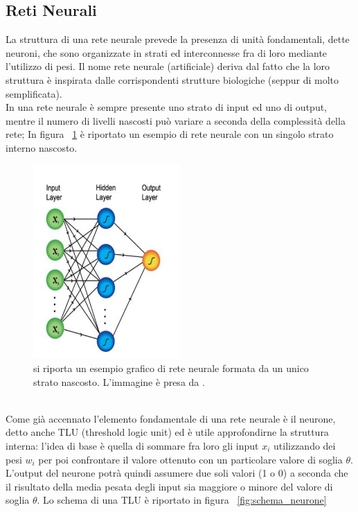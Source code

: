 \subsection{Reti Neurali}
\label{reti neurali}
La struttura di una rete neurale prevede la presenza di unità fondamentali, dette neuroni, che sono organizzate in strati ed interconnesse fra di loro mediante l'utilizzo di pesi. Il nome rete neurale (artificiale) deriva dal fatto che la loro struttura è inspirata dalle corrispondenti strutture biologiche (seppur di molto semplificata). \\
In una rete neurale è sempre presente uno strato di input ed uno di output, mentre il numero di livelli nascosti può variare a seconda della complessità della rete; In figura ~\ref{fig:schemaNN} è riportato un esempio di rete neurale con un singolo strato interno nascosto.
\begin{figure}[h!]
	\centering
	\includegraphics[width=0.50\textwidth]{figs/schemaNN.png}
	\caption{si riporta un esempio grafico di rete neurale formata da un unico strato nascosto. L'immagine è presa da \cite{Metodi_multivariati}.}
	\label{fig:schemaNN}
\end{figure}
\\
Come già accennato l'elemento fondamentale di una rete neurale è il neurone, detto anche TLU (threshold logic unit) ed è utile approfondirne la struttura interna: l'idea di base è quella di sommare fra loro gli input $x_i$ utilizzando dei pesi $w_i$ per poi confrontare il valore ottenuto con un particolare valore di soglia $\theta$. L'output del neurone potrà quindi assumere due soli valori (1 o 0) a seconda che il risultato della media pesata degli input sia maggiore o minore del valore di soglia $\theta$.
Lo schema di una TLU è riportato in figura ~\ref{fig:schema_neurone} 
